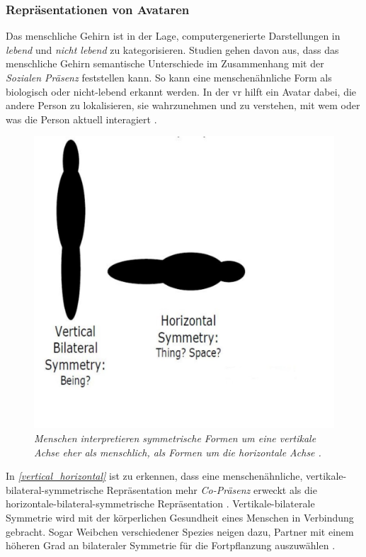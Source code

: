 \documentclass[a4paper,11pt]{article}%
\renewcommand{\\}{\vspace*{0.5\baselineskip} \newline}
\begin{document}
\subsubsection{Repräsentationen von Avataren}
Das menschliche Gehirn ist in der Lage, computergenerierte Darstellungen in \textit{lebend} und \textit{nicht lebend} zu kategorisieren. Studien gehen davon aus, dass das menschliche Gehirn semantische Unterschiede im Zusammenhang mit der \textit{Sozialen Präsenz} feststellen kann. So kann eine menschenähnliche Form als biologisch oder nicht-lebend erkannt werden. 
In der \ac{vr} hilft ein Avatar dabei, die andere Person zu lokalisieren, sie wahrzunehmen und zu verstehen, mit wem oder was die Person aktuell interagiert \citep{pan2017impact}.

	\begin{figure}[b!]
		\begin{footnotesize}
		\centering
			\includegraphics[scale= 0.3]{Abbildungen/Symmetry.JPG}
			\caption[Vertical and horizontal beeings]{\textit{Menschen interpretieren symmetrische Formen um eine vertikale Achse eher als menschlich, als Formen um die horizontale Achse \citep{biocca2002defining}.}}
			\label{vertical_horizontal}
		\end{footnotesize}
	\end{figure}

In \textit{\autoref{vertical_horizontal}} ist zu erkennen, dass eine menschenähnliche, vertikale-bilateral-symmetrische Repräsentation mehr \textit{Co-Präsenz} erweckt als die horizontale-bilateral-symmetrische Repräsentation \citep[S. 546-551]{thornhill1998relative}.
Vertikale-bilaterale Symmetrie wird mit der körperlichen Gesundheit eines Menschen in Verbindung gebracht. Sogar Weibchen verschiedener Spezies neigen dazu, Partner mit einem höheren Grad an bilateraler Symmetrie für die Fortpflanzung auszuwählen \citep[S. 659–669]{rhodes1998facial} \citep{biocca2002defining} \citep[S. 233–242]{grammer1994human}.
\end{document}
